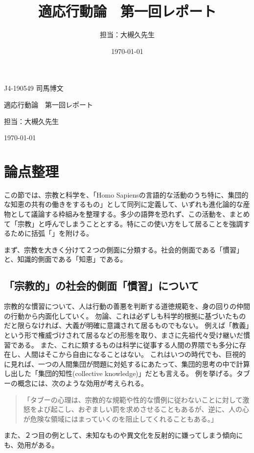 \documentclass[uplatex, 10.5pt, dvipdfmx]{jsarticle}
\title{適応行動論　第一回レポート}
\author{担当：大槻久先生}
\date{\today}
\begin{document}
\begin{flushright}
    J4-190549 司馬博文
\end{flushright}
\begin{center}
    適応行動論　第一回レポート

    担当：大槻久先生

    \today
\end{center}

\section{論点整理}
この節では、宗教と科学を、「Homo Sapiensの言語的な活動のうち特に、集団的な知恵の共有の働きをするもの」として同列に定義して、いずれも進化論的な産物として議論する枠組みを整理する。多少の語弊を恐れず、この活動を、まとめて「宗教」と呼んでしまうこととする。特にこの使い方をして居ることを強調するために括弧「」を附ける。

まず、宗教を大きく分けて２つの側面に分類する。社会的側面である「慣習」と、知識的側面である「知恵」である。

\subsection{「宗教的」の社会的側面「慣習」について}

宗教的な慣習について、人は行動の善悪を判断する道徳規範を、身の回りの仲間の行動から内面化していく。
勿論、これは必ずしも科学的根拠に基づいたものだと限らなければ、大義が明確に意識されて居るものでもない。
例えば「教義」という形で権威づけされて居るなどの形態を取り、まさに先祖代々受け継いだ慣習である。
また、これに類するものは科学に従事する人間の界隈でも多分に存在し、人間はそこから自由になることはない。
これはいつの時代でも、巨視的に見れば、一つの人間集団が問題に対処するにあたって、集団的思考の中で計算し出した「集団的知性(collective knowledge)」だとも言える。
例を挙げる。タブーの概念には、次のような効用が考えられる。

\begin{quotation}
    「タブーの心理は、宗教的な規範や性的な慣例に従わないことに対して激怒をよび起こし、おぞましい罰を求めさせることもあるが、逆に、人の心が危険な領域にはまっていくのを阻止してくれることもある。」\cite{暴力の人類学}
\end{quotation}

また、２つ目の例として、未知なものや異文化を反射的に嫌ってしまう傾向にも、効用がある。
\end{document}
